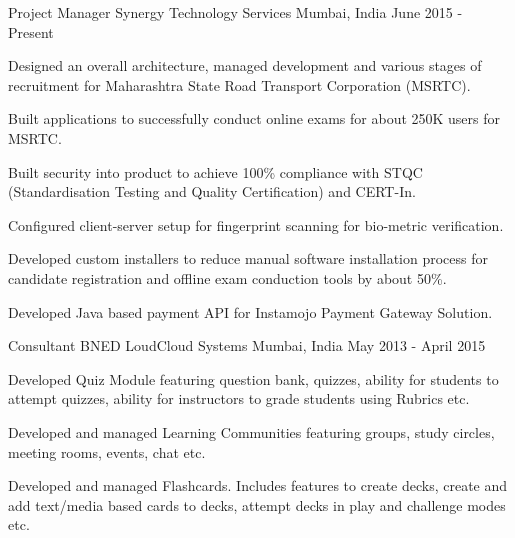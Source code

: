 

\begin{cventries}

  \cventry
    {Project Manager} %
    {Synergy Technology Services} %
    {Mumbai, India} %
    {June 2015 - Present} %
    {
      \begin{cvitems} %
        \item {Designed an overall architecture, managed development and various stages of recruitment for Maharashtra State Road Transport Corporation (MSRTC).}
        \item {Built applications to successfully conduct online exams for about 250K users for MSRTC.}
        \item {Built security into product to achieve 100\% compliance with STQC (Standardisation Testing and Quality Certification) and CERT-In.}
        \item {Configured client-server setup for fingerprint scanning for bio-metric verification.}
        \item {Developed custom installers to reduce manual software installation process for candidate registration and offline exam conduction tools by about 50\%.}
        \item {Developed Java based payment API for Instamojo Payment Gateway Solution.}
      \end{cvitems}
    }

  \cventry
  {Consultant} %
  {BNED LoudCloud Systems} %
  {Mumbai, India} %
  {May 2013 - April 2015} %
  {
  \begin{cvitems} %
    \item {Developed Quiz Module featuring question bank, quizzes, ability for students to attempt quizzes, ability for instructors to grade students using Rubrics etc.}
    \item {Developed and managed Learning Communities featuring groups, study circles, meeting rooms, events, chat etc.}
    \item {Developed and managed Flashcards. Includes features to create decks, create and add text/media based cards to decks, attempt decks in play and challenge modes etc.}
  \end{cvitems}
  }


\end{cventries}
